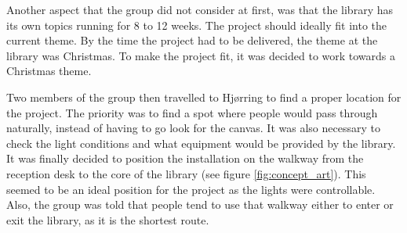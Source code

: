 Another aspect that the group did not consider at first, was that the library has its own topics running for 8 to 12 weeks. The project should ideally fit into the current theme. By the time the project had to be delivered, the theme at the library was Christmas. To make the project fit, it was decided to work towards a Christmas theme.

Two members of the group then travelled to Hj{\o}rring to find a proper location for the project. The priority was to find a spot where people would pass through naturally, instead of having to go look for the canvas. It was also necessary to check the light conditions and what equipment would be provided by the library. It was finally decided to position the installation on the walkway from the reception desk to the core of the library (see figure \ref{fig:concept_art}). This seemed to be an ideal position for the project as the lights were controllable. Also, the group was told that people tend to use that walkway either to enter or exit the library, as it is the shortest route. 





